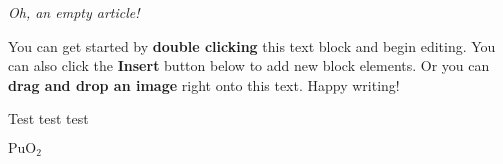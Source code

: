 

\textit{Oh, an empty article!} 

You can get started by \textbf{double clicking} this text block and begin editing. You can also click the \textbf{Insert} button below to add new block elements. Or you can \textbf{drag and drop an image} right onto this text. Happy writing!
  
  Test test test
  
$\text{PuO}_2$
  
  \PuOzwei
  
  
  
  
